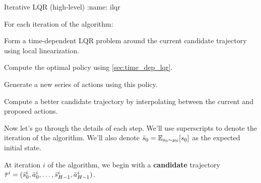 \documentclass[\main/main]{subfiles}
\begin{document}
\begin{definition}{Iterative LQR (high-level)}
:name: ilqr

    For each iteration of the algorithm:
    \begin{steps}
        \item Form a time-dependent LQR problem around the current candidate trajectory using local linearization.
        \item Compute the optimal policy using \autoref{sec:time_dep_lqr}.
        \item Generate a new series of actions using this policy.
        \item Compute a better candidate trajectory by interpolating between the current and proposed actions.
    \end{steps}
\end{definition}

Now let's go through the details of each step. We'll use superscripts to denote the iteration of the algorithm. We'll also denote $\bar {s}_0 = \operatorname*{\mathbb{E}}_{s_0 \sim \mu_0} [s_0]$ as the expected initial state.

At iteration $i$ of the algorithm, we begin with a \textbf{candidate} trajectory $\bar \tau^i = (\bar {s}^i_0, \bar {a}^i_0, \dots, \bar {s}^i_{H-1}, \bar {a}^i_{H-1})$.
\end{document}
